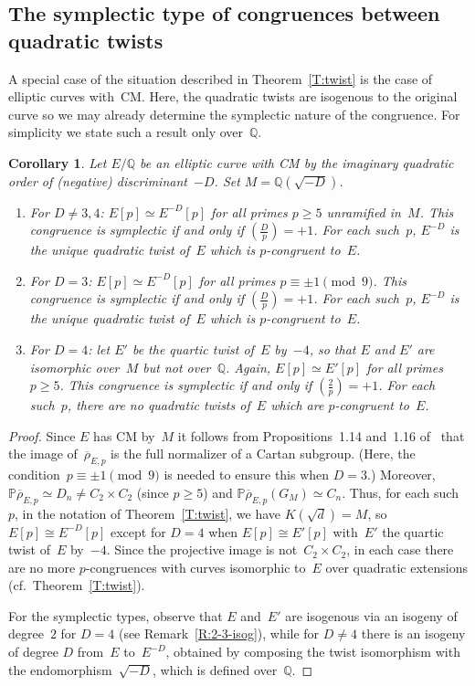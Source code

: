 \documentclass[twoside,leqno,symbols-for-thanks, draft]{rmi}
\numberwithin{equation}{section}
\newcommand{\PP}{\mathbb{P}}
\newcommand{\Q}{\mathbb{Q}}
\newcommand{\rhobar}{{\overline{\rho}}}
\def\legendre#1#2{\left(\displaystyle\frac{#1}{#2}\right)}
\newtheorem{corollary}[theorem]{Corollary}
\theoremstyle{remark}
\begin{document}
\subsection{The symplectic type of congruences between quadratic twists}
\label{SS:typeQuadratic}
A special case of the situation described 
in Theorem~\ref{T:twist} is the case
of elliptic curves with~CM.  Here, the quadratic twists are isogenous
to the original curve so we may already determine the symplectic nature
of the congruence.  For simplicity we state such a result only over~$\Q$.

\begin{corollary}\label{C:CM-twist}
  Let $E/\Q$ be an elliptic curve with CM by the imaginary quadratic
  order of (negative) discriminant~$-D$.  Set $M=\Q(\sqrt{-D})$.

  \begin{enumerate}
  \item
    For $D\not=3,4$: $E[p] \simeq E^{-D}[p]$ for all primes $p \geq 5$
    unramified in~$M$.  This congruence
    is symplectic if and only if $\legendre{D}{p}=+1$.  For each
    such~$p$, $E^{-D}$ is the unique quadratic twist of~$E$
    which is $p$-congruent to~$E$.

  \item
    For $D=3$: $E[p] \simeq E^{-D}[p]$ for all primes $p
    \equiv\pm1\pmod{9}$.  This congruence is
    symplectic if and only if $\legendre{D}{p}=+1$.  For each
    such~$p$, $E^{-D}$ is the unique quadratic twist of~$E$ which is
    $p$-congruent to~$E$.

  \item
    For $D=4$: let $E'$ be the quartic twist of~$E$ by~$-4$, so that
    $E$ and $E'$ are isomorphic over~$M$ but not over~$\Q$.  Again,
    $E[p] \simeq E'[p]$ for all primes $p \geq 5$.  This congruence is
    symplectic if and only if $\legendre{2}{p}=+1$.  For each
    such~$p$, there are no quadratic twists of~$E$ which are
    $p$-congruent to~$E$.
  \end{enumerate}
\end{corollary}
\begin{proof}
Since $E$ has CM by~$M$ it follows from Propositions~1.14
  and~1.16 of~\cite{Zywina} that the image of~$\rhobar_{E,p}$ is the full
normalizer of a Cartan subgroup.  (Here, the
condition~$p\equiv\pm1\pmod{9}$ is needed to ensure this when $D=3$.)
Moreover, $\PP \rhobar_{E,p} \simeq D_n \neq C_2 \times C_2$ (since $p
\geq 5$) and $\PP \rhobar_{E,p}(G_M) \simeq C_n$. Thus, for each
such~$p$, in the notation of Theorem~\ref{T:twist}, we have
$K(\sqrt{d})=M$, so $E[p]\cong E^{-D}[p]$ except for $D=4$ when
$E[p]\cong E'[p]$ with~$E'$ the quartic twist of~$E$ by~$-4$.  Since
the projective image is not~$C_2\times C_2$, in each case there are no
more $p$-congruences with curves isomorphic to~$E$ over quadratic
extensions (cf.~Theorem~\ref{T:twist}).

For the symplectic types, observe that $E$ and~$E'$ are isogenous via
an isogeny of degree~$2$ for $D=4$ (see Remark~\ref{R:2-3-isog}), while
for $D\not=4$ there is an isogeny of degree $D$ from~$E$ to~$E^{-D}$,
obtained by composing the twist isomorphism with the
endomorphism~$\sqrt{-D}$, which is defined over~$\Q$.
\end{proof}
\end{document}
